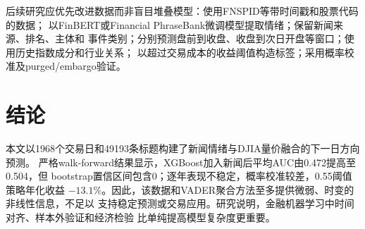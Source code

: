 \documentclass[UTF8,a4paper,9pt,twocolumn,fontset=none]{ctexart}
\begin{document}
后续研究应优先改进数据而非盲目堆叠模型：使用FNSPID等带时间戳和股票代码的数据；
以FinBERT或Financial PhraseBank微调模型提取情绪；保留新闻来源、排名、主体和
事件类别；分别预测盘前到收盘、收盘到次日开盘等窗口；使用历史指数成分和行业关系；
以超过交易成本的收益阈值构造标签；采用概率校准及purged/embargo验证。

\section{结论}

本文以1968个交易日和49193条标题构建了新闻情绪与DJIA量价融合的下一日方向预测。
严格walk-forward结果显示，XGBoost加入新闻后平均AUC由0.472提高至0.504，但
bootstrap置信区间包含0；逐年表现不稳定，概率校准较差，0.55阈值策略年化收益
$-13.1\%$。因此，该数据和VADER聚合方法至多提供微弱、时变的非线性信息，不足以
支持稳定预测或交易应用。研究说明，金融机器学习中时间对齐、样本外验证和经济检验
比单纯提高模型复杂度更重要。
\end{document}
